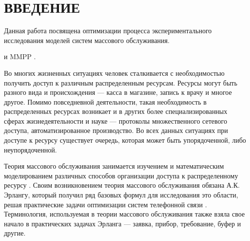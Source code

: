 \section*{ВВЕДЕНИЕ}


Данная работа посвящена оптимизации процесса экспериментального исследования моделей систем массового обслуживания.

 \cite{phung2019retrial} и MMPP \cite{baiocchi1993steady,2019asymptotic,meier1987fitting}.


\cite{задорожный2011методы}

Во многих жизненных ситуациях человек сталкивается с необходимостью получить доступ к различным распределенным ресурсам. Ресурсы могут быть разного вида и происхождения --- касса в магазине, запись к врачу и многое другое. Помимо повседневной деятельности, такая необходимость в распределенных ресурсах возникает и в других более специализированных сферах жизнедеятельности и науке --- протоколы множественного сетевого доступа, автоматизированное производство. Во всех данных ситуациях при доступе к ресурсу существует очередь, которая может быть упорядоченной, либо неупорядоченной.

Теория массового обслуживания занимается изучением и математическим моделированием различных способов организации доступа к распределенному ресурсу \cite{nazarov2010theory}. Своим возникновением теория массового обслуживания обязана А.К. Эрлангу, который получил ряд базовых формул для исследования это области, решая практические задачи оптимизации систем телефонной связи \cite{erlang1909theory}. Терминология, используемая в теории массового обслуживания также взяла свое начало в практических задачах Эрланга ---  заявка, прибор, требование, буфер и другие.

